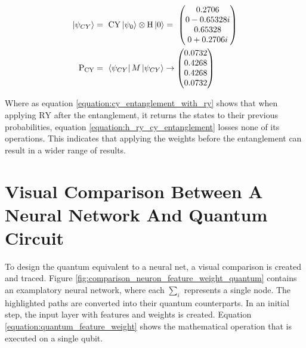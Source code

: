 \begin{equation}
    \centering
    \begin{split}
    \ket{\psi_{CY}} &=\ \mathrm{CY}\ket{\psi_0}\otimes\mathrm{H}\ket{0} =\ \begin{pmatrix}
     0.2706\\
     0-0.65328i\\
     0.65328\\
     0+0.2706i\\
     \end{pmatrix} \\
    \mathrm{P_{CY}} &=\ \bra{\psi_{CY}}M\ket{\psi_{CY}} \rightarrow \begin{pmatrix}
    0.0732\\
    0.4268\\
    0.4268\\
    0.0732\\
     \end{pmatrix}
    \end{split}
    \label{equation:h_ry_cy_entanglement}
\end{equation}

Where as equation \ref{equation:cy_entanglement_with_ry} shows that when applying $\mathrm{RY}$ after the entanglement, it returns the states to their previous probabilities,  equation \ref{equation:h_ry_cy_entanglement} losses none of its operations. This indicates that applying the weights before the entanglement can result in a wider range of results.

\clearpage
\section{Visual Comparison Between A Neural Network And Quantum Circuit}

To design the quantum equivalent to a neural net, a visual comparison is created and traced. Figure \ref{fig:comparison_neuron_feature_weight_quantum} contains an examplatory neural network, where each $\sum_i$ represents a single node. The highlighted paths are converted into their quantum counterparts. In an initial step, the input layer with features and weights is created. Equation \ref{equation:quantum_feature_weight} shows the mathematical operation that is executed on a single qubit.

